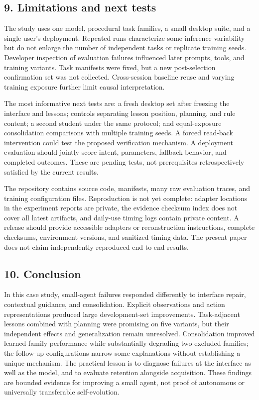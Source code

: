 \documentclass[
  10pt,
]{article}
\begin{document}
\subsection{9. Limitations and next
tests}\label{limitations-and-next-tests}

The study uses one model, procedural task families, a small desktop
suite, and a single user's deployment. Repeated runs characterize some
inference variability but do not enlarge the number of independent tasks
or replicate training seeds. Developer inspection of evaluation failures
influenced later prompts, tools, and training variants. Task manifests
were fixed, but a new post-selection confirmation set was not collected.
Cross-session baseline reuse and varying training exposure further limit
causal interpretation.

The most informative next tests are: a fresh desktop set after freezing
the interface and lessons; controls separating lesson position,
planning, and rule content; a second student under the same protocol;
and equal-exposure consolidation comparisons with multiple training
seeds. A forced read-back intervention could test the proposed
verification mechanism. A deployment evaluation should jointly score
intent, parameters, fallback behavior, and completed outcomes. These are
pending tests, not prerequisites retrospectively satisfied by the
current results.

The repository contains source code, manifests, many raw evaluation
traces, and training configuration files. Reproduction is not yet
complete: adapter locations in the experiment reports are private, the
evidence checksum index does not cover all latest artifacts, and
daily-use timing logs contain private content. A release should provide
accessible adapters or reconstruction instructions, complete checksums,
environment versions, and sanitized timing data. The present paper does
not claim independently reproduced end-to-end results.

\subsection{10. Conclusion}\label{conclusion}

In this case study, small-agent failures responded differently to
interface repair, contextual guidance, and consolidation. Explicit
observations and action representations produced large development-set
improvements. Task-adjacent lessons combined with planning were
promising on five variants, but their independent effects and
generalization remain unresolved. Consolidation improved learned-family
performance while substantially degrading two excluded families; the
follow-up configurations narrow some explanations without establishing a
unique mechanism. The practical lesson is to diagnose failures at the
interface as well as the model, and to evaluate retention alongside
acquisition. These findings are bounded evidence for improving a small
agent, not proof of autonomous or universally transferable
self-evolution.
\end{document}
